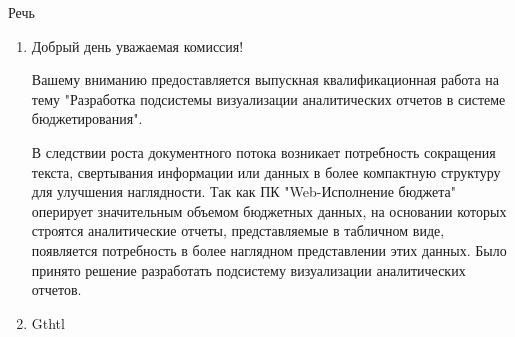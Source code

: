 \documentclass[a4paper, 12pt]{report}
\begin{document}
\begin{center}
	\Large Речь
\end{center}\par 
\begin{enumerate}
\item Добрый день уважаемая комиссия!\par 
Вашему вниманию предоставляется выпускная квалификационная работа на тему "Разработка подсистемы визуализации аналитических отчетов в системе бюджетирования".\par
В следствии роста документного потока возникает потребность сокращения текста, свертывания информации или данных в более компактную структуру для улучшения наглядности. 
Так как ПК "Web-Исполнение бюджета" оперирует значительным объемом бюджетных данных, на основании которых строятся аналитические отчеты, представляемые в табличном виде, 
появляется потребность в более наглядном представлении этих данных. Было принято решение разработать подсистему визуализации аналитических отчетов.\par
\item Gthtl 
\end{enumerate}
\end{document}
